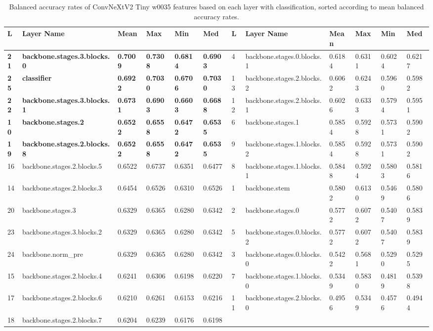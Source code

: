\begin{table}[h]
\centering
\caption{Balanced accuracy rates of ConvNeXtV2 Tiny w0035 features based on each layer with classification, sorted according to mean balanced accuracy rates.}
\begin{tabular}{|l|l|l|l|l|l||l|l|l|l|l|l|}
\hline
L & Layer Name & Mean & Max & Min & Med & L & Layer Name & Mean & Max & Min & Med \\ \hline
\textbf{21} & \textbf{backbone.stages.3.blocks.0} & \textbf{0.7009} & \textbf{0.7308} & \textbf{0.6814} & \textbf{0.6903} & 4 & backbone.stages.0.blocks.1 & 0.6184 & 0.6311 & 0.6024 & 0.6217 \\ \hline
\textbf{25} & \textbf{classifier} & \textbf{0.6922} & \textbf{0.7030} & \textbf{0.6706} & \textbf{0.7030} & 13 & backbone.stages.2.blocks.2 & 0.6062 & 0.6243 & 0.5960 & 0.5982 \\ \hline
\textbf{22} & \textbf{backbone.stages.3.blocks.1} & \textbf{0.6731} & \textbf{0.6903} & \textbf{0.6603} & \textbf{0.6688} & 12 & backbone.stages.2.blocks.1 & 0.6026 & 0.6333 & 0.5794 & 0.5951 \\ \hline
\textbf{10} & \textbf{backbone.stages.2} & \textbf{0.6522} & \textbf{0.6558} & \textbf{0.6472} & \textbf{0.6535} & 6 & backbone.stages.1 & 0.5854 & 0.5928 & 0.5731 & 0.5902 \\ \hline
\textbf{19} & \textbf{backbone.stages.2.blocks.8} & \textbf{0.6522} & \textbf{0.6558} & \textbf{0.6472} & \textbf{0.6535} & 9 & backbone.stages.1.blocks.2 & 0.5854 & 0.5928 & 0.5731 & 0.5902 \\ \hline
16 & backbone.stages.2.blocks.5 & 0.6522 & 0.6737 & 0.6351 & 0.6477 & 8 & backbone.stages.1.blocks.1 & 0.5848 & 0.5924 & 0.5803 & 0.5816 \\ \hline
14 & backbone.stages.2.blocks.3 & 0.6454 & 0.6526 & 0.6310 & 0.6526 & 1 & backbone.stem & 0.5802 & 0.6130 & 0.5469 & 0.5806 \\ \hline
20 & backbone.stages.3 & 0.6329 & 0.6365 & 0.6280 & 0.6342 & 2 & backbone.stages.0 & 0.5772 & 0.6072 & 0.5407 & 0.5839 \\ \hline
23 & backbone.stages.3.blocks.2 & 0.6329 & 0.6365 & 0.6280 & 0.6342 & 5 & backbone.stages.0.blocks.2 & 0.5772 & 0.6072 & 0.5407 & 0.5839 \\ \hline
24 & backbone.norm\_pre & 0.6329 & 0.6365 & 0.6280 & 0.6342 & 3 & backbone.stages.0.blocks.0 & 0.5422 & 0.5681 & 0.5290 & 0.5295 \\ \hline
15 & backbone.stages.2.blocks.4 & 0.6241 & 0.6306 & 0.6198 & 0.6220 & 7 & backbone.stages.1.blocks.0 & 0.5349 & 0.5830 & 0.4819 & 0.5398 \\ \hline
17 & backbone.stages.2.blocks.6 & 0.6210 & 0.6261 & 0.6153 & 0.6216 & 11 & backbone.stages.2.blocks.0 & 0.4956 & 0.5349 & 0.4576 & 0.4944 \\ \hline
18 & backbone.stages.2.blocks.7 & 0.6204 & 0.6239 & 0.6176 & 0.6198 & & & & & &  \\ \hline
\end{tabular}
\end{table}
